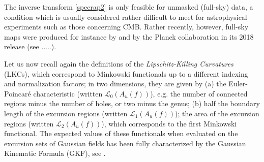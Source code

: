 \documentclass[aps,prd,showpacs,superscriptaddress,groupedaddress]{revtex4-1}  %
\begin{document}
The inverse transform \eqref{specrap2} is only feasible for unmasked (full-sky) data, a condition which is usually considered rather difficult to meet for astrophysical experiments such as those concerning CMB. Rather recently, however, full-sky maps were produced for instance by \cite{starketal2014} and by the Planck collaboration in its 2018 release (see .....). 



Let us now recall again the definitions of the \emph{Lipschitz-Killing Curvatures} (LKCs), which correspond to Minkowski functionals up to a different indexing and normalization factors; in two dimensions, they are given by  (a) the Euler-Poincar\'{e} characteristic (written $\mathcal{L}_{0}(A_{u}(f))$), e.g. the number of connected
regions minus the number of holes, or two minus the genus; (b) half the boundary length of
the excursion regions (written $\mathcal{L}_{1}(A_{u}(f))$); the area of the excursion
regions (written $\mathcal{L}_{2}(A_{u}(f))$), which corresponds to the first Minkowski functional. The expected values of these functionals when evaluated on the excursion sets of Gaussian fields has been fully characterized by the Gaussian Kinematic Formula (GKF), see \cite{TaylorAdler2009}. 
\end{document}
